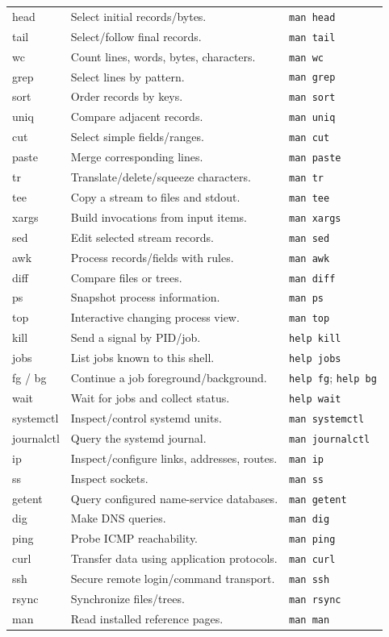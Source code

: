 \documentclass[11pt,oneside,openany]{book}
\begin{document}
\begin{longtable}{>{\ttfamily}p{}p{}p{}}
head & Select initial records/bytes. & \texttt{man head} \\
tail & Select/follow final records. & \texttt{man tail} \\
wc & Count lines, words, bytes, characters. & \texttt{man wc} \\
grep & Select lines by pattern. & \texttt{man grep} \\
sort & Order records by keys. & \texttt{man sort} \\
uniq & Compare adjacent records. & \texttt{man uniq} \\
cut & Select simple fields/ranges. & \texttt{man cut} \\
paste & Merge corresponding lines. & \texttt{man paste} \\
tr & Translate/delete/squeeze characters. & \texttt{man tr} \\
tee & Copy a stream to files and stdout. & \texttt{man tee} \\
xargs & Build invocations from input items. & \texttt{man xargs} \\
sed & Edit selected stream records. & \texttt{man sed} \\
awk & Process records/fields with rules. & \texttt{man awk} \\
diff & Compare files or trees. & \texttt{man diff} \\
ps & Snapshot process information. & \texttt{man ps} \\
top & Interactive changing process view. & \texttt{man top} \\
kill & Send a signal by PID/job. & \texttt{help kill} \\
jobs & List jobs known to this shell. & \texttt{help jobs} \\
fg / bg & Continue a job foreground/background. & \texttt{help fg}; \texttt{help bg} \\
wait & Wait for jobs and collect status. & \texttt{help wait} \\
systemctl & Inspect/control systemd units. & \texttt{man systemctl} \\
journalctl & Query the systemd journal. & \texttt{man journalctl} \\
ip & Inspect/configure links, addresses, routes. & \texttt{man ip} \\
ss & Inspect sockets. & \texttt{man ss} \\
getent & Query configured name-service databases. & \texttt{man getent} \\
dig & Make DNS queries. & \texttt{man dig} \\
ping & Probe ICMP reachability. & \texttt{man ping} \\
curl & Transfer data using application protocols. & \texttt{man curl} \\
ssh & Secure remote login/command transport. & \texttt{man ssh} \\
rsync & Synchronize files/trees. & \texttt{man rsync} \\
man & Read installed reference pages. & \texttt{man man} \\
\bottomrule
\end{longtable}
\end{document}
